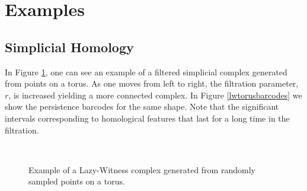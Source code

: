 \documentclass[10pt]{article}
\begin{document}
\section{Examples}

\subsection{Simplicial Homology}

In Figure \ref{lwtorus}, one can see an example of a filtered simplicial complex generated from points on a torus. As one moves from left to right, the filtration parameter, $r$, is increased yielding a more connected complex. In Figure \ref{lwtorusbarcodes} we show the persistence barcodes for the same shape. Note that the significant intervals corresponding to homological features that last for a long time in the filtration.

\begin{figure}
\centering
\mbox{
\quad
{}\quad
{}\quad
{}\quad
{}\quad
{}}
\caption{Example of a Lazy-Witness complex generated from randomly sampled points on a torus.} \label{lwtorus}
\end{figure}
\end{document}
